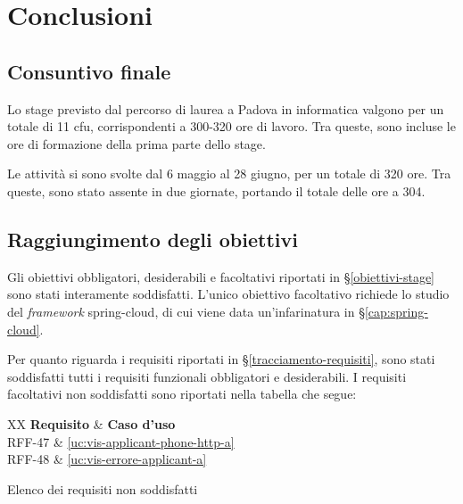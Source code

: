 
\chapter{Conclusioni}\label{cap:conclusioni}


\section{Consuntivo finale}

Lo stage previsto dal percorso di laurea a Padova in informatica valgono per un totale di 11 \gls{cfu}, corrispondenti a 300-320 ore di lavoro. Tra queste, sono incluse le ore di formazione della prima parte dello stage.

Le attività si sono svolte dal 6 maggio al 28 giugno, per un totale di 320 ore. Tra queste, sono stato assente in due giornate, portando il totale delle ore a 304.

\section{Raggiungimento degli obiettivi}
Gli obiettivi obbligatori, desiderabili e facoltativi riportati in \S\ref{obiettivi-stage} sono stati interamente soddisfatti. L'unico obiettivo facoltativo richiede lo studio del \textit{framework} \gls{spring-cloud}, di cui viene data un'infarinatura in \S\ref{cap:spring-cloud}.

Per quanto riguarda i requisiti riportati in \S\ref{tracciamento-requisiti}, sono stati soddisfatti tutti i requisiti funzionali obbligatori e desiderabili. 
I requisiti facoltativi non soddisfatti sono riportati nella tabella che segue:

\begin{table}[H]
	\centering
	\begin{paddedtablex}[1.4]{0.5\textwidth}{XX}
		\textbf{Requisito} & \textbf{Caso d'uso}\\
		\toprule
		RFF-47 & \ref{uc:vis-applicant-phone-http-a}\\
		RFF-48 & \ref{uc:vis-errore-applicant-a}\\
		\bottomrule
	\end{paddedtablex}
	\vspace{4pt}
	\caption{Elenco dei requisiti non soddisfatti}
\end{table}

